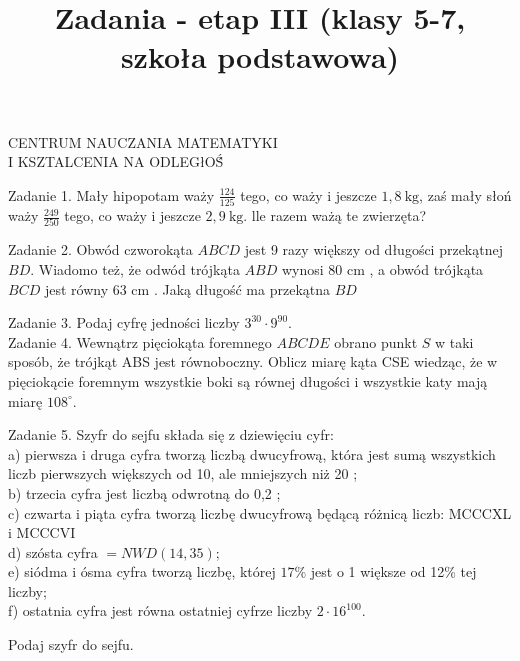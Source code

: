 \documentclass[10pt]{article}
\title{Zadania - etap III (klasy 5-7, szkoła podstawowa) }
\author{}
\date{}
\begin{document}
\maketitle
CENTRUM NAUCZANIA MATEMATYKI\\
I KSZTALCENIA NA ODLEGłOŚ́

Zadanie 1. Mały hipopotam waży \(\frac{124}{125}\) tego, co waży i jeszcze \(1,8 \mathrm{~kg}\), zaś mały słoń waży \(\frac{249}{250}\) tego, co waży i jeszcze \(2,9 \mathrm{~kg}\). lle razem ważą te zwierzęta?

Zadanie 2. Obwód czworokąta \(A B C D\) jest 9 razy większy od długości przekątnej \(B D\). Wiadomo też, że odwód trójkąta \(A B D\) wynosi 80 cm , a obwód trójkąta \(B C D\) jest równy 63 cm . Jaką długość ma przekątna \(B D\)

Zadanie 3. Podaj cyfrę jedności liczby \(3^{30} \cdot 9^{90}\).\\
Zadanie 4. Wewnątrz pięciokąta foremnego \(A B C D E\) obrano punkt \(S\) w taki sposób, że trójkąt ABS jest równoboczny. Oblicz miarę kąta CSE wiedząc, że w pięciokącie foremnym wszystkie boki są równej długości i wszystkie katy mają miarę \(108^{\circ}\).

Zadanie 5. Szyfr do sejfu składa się z dziewięciu cyfr:\\
a) pierwsza i druga cyfra tworzą liczbą dwucyfrową, która jest sumą wszystkich liczb pierwszych większych od 10, ale mniejszych niż 20 ;\\
b) trzecia cyfra jest liczbą odwrotną do 0,2 ;\\
c) czwarta i piąta cyfra tworzą liczbę dwucyfrową będącą różnicą liczb: MCCCXL i MCCCVI\\
d) szósta cyfra \(=N W D(14,35)\);\\
e) siódma i ósma cyfra tworzą liczbę, której \(17 \%\) jest o 1 większe od 12\% tej liczby;\\
f) ostatnia cyfra jest równa ostatniej cyfrze liczby \(2 \cdot 16^{100}\).

Podaj szyfr do sejfu.
\end{document}
